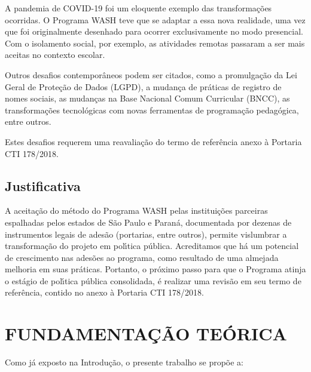 \documentclass[
12pt,		%
openright,	%
twoside,  %
a4paper,			%
chapter=TITLE,		%
english,			%
french,				%
spanish,			%
brazil				%
]{USPSC-classe/USPSC}
\begin{document}
A pandemia de COVID-19 foi um eloquente exemplo das transforma\c{c}\~oes ocorridas. O Programa WASH teve que se adaptar a essa nova realidade, uma vez que foi originalmente desenhado para ocorrer exclusivamente no modo presencial. Com o isolamento social, por exemplo, as atividades remotas passaram a ser mais aceitas no contexto escolar.









Outros desafios contempor\^aneos podem ser citados, como a promulga\c{c}\~ao da Lei Geral de Prote\c{c}\~ao de Dados (LGPD), a mudan\c{c}a de pr\'aticas de registro de nomes sociais, as mudan\c{c}as na Base Nacional Comum Curricular (BNCC), as transforma\c{c}\~oes tecnol\'ogicas com novas ferramentas de programa\c{c}\~ao pedag\'ogica, entre outros.









Estes desafios requerem uma reavalia\c{c}\~ao do termo de refer\^encia anexo \`a Portaria CTI 178/2018.









\section[Justificativa]{Justificativa}\label{Justificativa}
A aceita\c{c}\~ao do m\'etodo do Programa WASH pelas institui\c{c}\~oes parceiras espalhadas pelos estados de S\~ao Paulo e Paran\'a, documentada por dezenas de instrumentos legais de ades\~ao (portarias, entre outros), permite vislumbrar a transforma\c{c}\~ao do projeto em pol\'{\i}tica p\'ublica. Acreditamos que h\'a um potencial de crescimento nas ades\~oes ao programa, como resultado de uma almejada melhoria em suas pr\'aticas. Portanto, o pr\'oximo passo para que o Programa atinja o est\'agio de pol\'{\i}tica p\'ublica consolidada, \'e realizar uma revis\~ao em seu termo de refer\^encia, contido no anexo \`a Portaria CTI 178/2018.









\chapter[FUNDAMENTA\c{C}\~AO TE\'ORICA ]{FUNDAMENTA\c{C}\~AO TE\'ORICA }\label{FUNDAMENTA\c{C}\~AO TE\'ORICA }
Como j\'a exposto na \textquotedbl Introdu\c{c}\~ao\textquotedbl , o presente trabalho se prop\~oe a:
\end{document}
